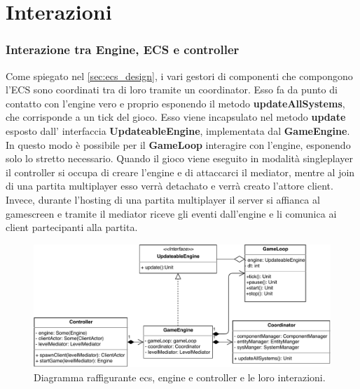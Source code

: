 \section{Interazioni}
\label{sec:interactions_design}

\subsubsection{Interazione tra Engine, ECS e controller}
Come spiegato nel \ref{sec:ecs_design}, i vari gestori di componenti che compongono l'ECS sono coordinati tra di loro tramite un coordinator. Esso fa da punto di contatto con l'engine vero e proprio esponendo il metodo \textbf{updateAllSystems}, che corrisponde a un tick del gioco. Esso viene incapsulato nel metodo \textbf{update} esposto dall' interfaccia \textbf{UpdateableEngine}, implementata dal \textbf{GameEngine}. In questo modo è possibile per il \textbf{GameLoop} interagire con l'engine, esponendo solo lo stretto necessario.
Quando il gioco viene eseguito in modalità singleplayer il controller si occupa di creare l'engine e di attaccarci il mediator, mentre al join di una partita multiplayer esso verrà detachato e verrà creato l'attore client. Invece, durante l'hosting di una partita multiplayer il server si affianca al gamescreen e tramite il mediator riceve gli eventi dall'engine e li comunica ai client partecipanti alla partita.
\begin{figure}[H]
	\centering
	\includegraphics[width=\columnwidth]{drawio/ECS-engine-controller/ecs-engine-controller.pdf}
	\caption{Diagramma raffigurante ecs, engine e controller e le loro interazioni.}
	\label{fig:ecs-engine-controller}
\end{figure}



